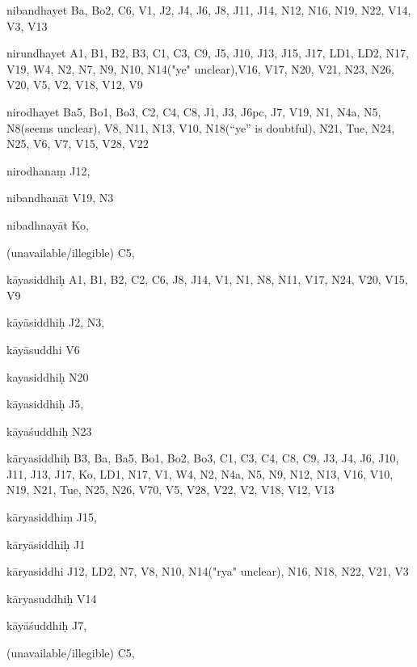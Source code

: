 \begin{ekdosis}
\begin{marma}[hp01_055]
    \begin{marma}[hp02_003]
    \item[nibandhayet] Ba, Bo2, C6, V1, J2, J4, J6, J8, J11, J14, N12, N16, N19, N22, V14, V3, V13
    \item[nirundhayet] A1, B1, B2, B3, C1, C3, C9, J5, J10, J13, J15, J17, LD1, LD2, N17, V19, W4, N2, N7, N9, N10, N14("ye" unclear),V16, V17, N20, V21, N23, N26, V20, V5, V2, V18, V12, V9
    \item[nirodhayet] Ba5, Bo1, Bo3, C2, C4, C8, J1, J3, J6pc, J7, V19, N1, N4a, N5, N8(seems unclear), V8, N11, N13, V10, N18(“ye” is doubtful), N21, Tue, N24, N25, V6, V7, V15, V28, V22
    \item[nirodhanaṃ] J12,
    \item[nibandhanāt] V19, N3
    \item[nibadhnayāt] Ko,
    \item[(unavailable/illegible)] C5,
      \begin{description}

      \end{description}
    \end{marma}



    \begin{marma}[hp02_004]
    \item[kāyasiddhiḥ] A1, B1, B2, C2, C6, J8, J14, V1, N1, N8, N11, V17, N24, V20, V15, V9
    \item[kāyāsiddhiḥ] J2, N3,
    \item[kāyāsuddhi] V6
    \item[kayasiddhiḥ] N20
    \item[kāyasiddhiḥ] J5,
    \item[kāyaśuddhiḥ] N23
    \item[kāryasiddhiḥ] B3, Ba, Ba5, Bo1, Bo2, Bo3, C1, C3, C4, C8, C9, J3, J4, J6, J10, J11, J13, J17, Ko, LD1, N17, V1, W4, N2, N4a, N5, N9, N12, N13, V16, V10, N19, N21, Tue, N25, N26, V70, V5, V28, V22, V2, V18, V12, V13
    \item[kāryasiddhiṃ] J15, 
    \item[kāryāsiddhiḥ] J1
    \item[kāryasiddhi] J12, LD2, N7, V8, N10, N14("rya" unclear), N16, N18, N22, V21, V3 
    \item[kāryasuddhiḥ] V14
    \item[kāyāśuddhiḥ] J7,
    \item[(unavailable/illegible)] C5,


\end{marma}
\end{marma}
\end{ekdosis}
